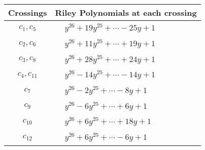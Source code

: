 \documentclass[1p]{elsarticle_modified}
\theoremstyle{definition}
\begin{document}
\begin{tabular}{m{50pt}|m{274pt}}
Crossings & \hspace{64pt}Riley Polynomials at each crossing \\
\hline $$\begin{aligned}c_{1},c_{5}\end{aligned}$$&$\begin{aligned}
&y^{26}+19 y^{25}+\cdots-25 y+1
\end{aligned}$\\
\hline $$\begin{aligned}c_{2},c_{6}\end{aligned}$$&$\begin{aligned}
&y^{26}+11 y^{25}+\cdots+19 y+1
\end{aligned}$\\
\hline $$\begin{aligned}c_{3},c_{8}\end{aligned}$$&$\begin{aligned}
&y^{26}+28 y^{25}+\cdots+24 y+1
\end{aligned}$\\
\hline $$\begin{aligned}c_{4},c_{11}\end{aligned}$$&$\begin{aligned}
&y^{26}-14 y^{25}+\cdots-14 y+1
\end{aligned}$\\
\hline $$\begin{aligned}c_{7}\end{aligned}$$&$\begin{aligned}
&y^{26}-2 y^{25}+\cdots-8 y+1
\end{aligned}$\\
\hline $$\begin{aligned}c_{9}\end{aligned}$$&$\begin{aligned}
&y^{26}-6 y^{25}+\cdots+6 y+1
\end{aligned}$\\
\hline $$\begin{aligned}c_{10}\end{aligned}$$&$\begin{aligned}
&y^{26}+6 y^{25}+\cdots+18 y+1
\end{aligned}$\\
\hline $$\begin{aligned}c_{12}\end{aligned}$$&$\begin{aligned}
&y^{26}+6 y^{25}+\cdots-6 y+1
\end{aligned}$\\
\hline
\end{tabular}\\~\\
\end{document}
